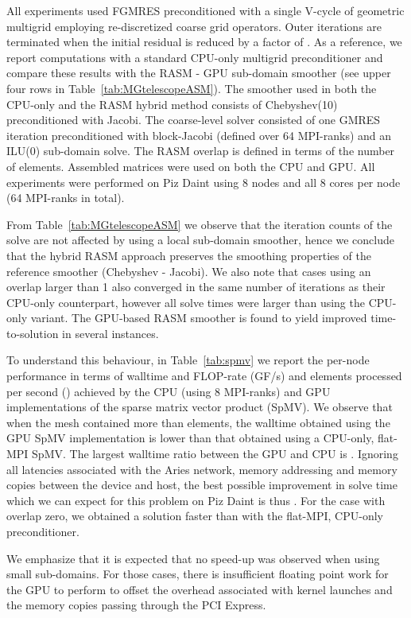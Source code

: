 \documentclass[]{siamart0216}
\begin{document}
All experiments used FGMRES preconditioned with a single V-cycle of geometric multigrid 
employing re-discretized coarse grid operators. 
Outer iterations are terminated when the initial residual is reduced by a factor of .
As a reference, we report computations with a standard CPU-only multigrid preconditioner and compare these results with 
the RASM - GPU sub-domain smoother (see upper four rows in Table~\ref{tab:MGtelescopeASM}).
The smoother used in both the CPU-only and the RASM hybrid method consists of Chebyshev(10) preconditioned with Jacobi.
The coarse-level solver consisted of one GMRES iteration preconditioned with block-Jacobi (defined over 64 MPI-ranks) and an
ILU(0) sub-domain solve. 
The RASM overlap is defined in terms of the number of  elements.
Assembled matrices were used on both the CPU and GPU.
All experiments were performed on Piz Daint using 8 nodes and all 8 cores per node (64 MPI-ranks in total).


From Table~\ref{tab:MGtelescopeASM} we observe that the iteration counts of the solve are not affected by using a local sub-domain smoother, 
hence we conclude that the hybrid RASM approach preserves the smoothing properties of the reference smoother (Chebyshev - Jacobi).
We also note that cases using an overlap larger than 1 also converged in the same number of iterations as their CPU-only counterpart, however 
all solve times were larger than using the CPU-only variant. The GPU-based RASM smoother is found to yield improved time-to-solution 
in several instances. 



To understand this behaviour, in Table~\ref{tab:spmv} we report the per-node performance in terms of walltime and FLOP-rate (GF/s) and elements processed per second () achieved by the CPU (using 8 MPI-ranks) and GPU implementations of the sparse matrix vector product (SpMV). 
We observe that when the mesh contained more than  elements, the walltime obtained using the GPU SpMV implementation is lower than that obtained using a CPU-only, flat-MPI SpMV.
The largest walltime ratio between the GPU and CPU is . Ignoring all latencies associated with the Aries network, memory addressing and memory copies between the device and host, the best possible improvement in solve time which we can expect for this problem on Piz Daint is  thus .
For the  case with overlap zero, we obtained a solution  faster than with the flat-MPI, CPU-only preconditioner.

We emphasize that it is expected that no speed-up was observed when using small sub-domains. For those cases, there is insufficient floating point work for the GPU to perform to offset the overhead associated with kernel launches and the memory copies passing through the PCI Express.
\end{document}
